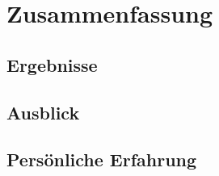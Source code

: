 \chapter{Zusammenfassung}

\section{Ergebnisse}

\section{Ausblick}

\section{Persönliche Erfahrung}
